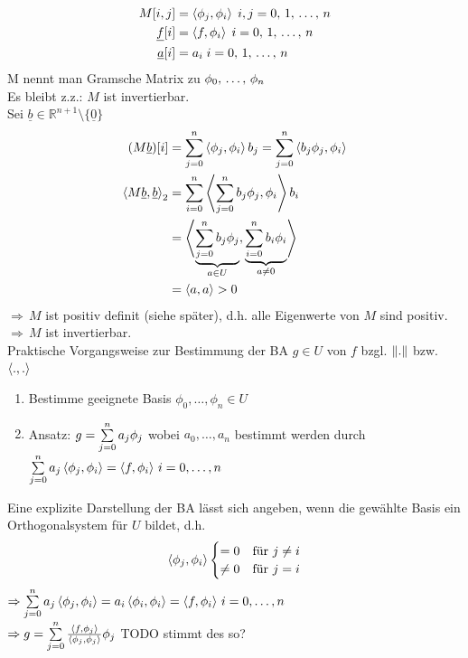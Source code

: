 \begin{align*}
  M[i,j] &= \left\langle \phi_j,  \phi_i \right\rangle\; i,j = 0,\,1,\,\ldots,\,n\\
    \underline{f}[i] &= \left\langle f,  \phi_i \right\rangle\; i = 0,\,1,\,\ldots,\,n\\
  \underline{a}[i] &= a_i\; i = 0,\,1,\,\ldots,\,n\\
\end{align*}
M nennt man Gramsche Matrix zu $\phi_0,\,\ldots,\,\phi_n$\\
Es bleibt z.z.: $M$ ist invertierbar.\\
Sei $\underline{b} \in \mathbb{R}^{n+1} \setminus \{\underline{0}\}$
\begin{align*}
  (M \underline{b})[i] &= \sum\limits_{j=0}^{n}{\left\langle \phi_j, \phi_i \right\rangle b_j} = \sum\limits_{j=0}^{n}{\left\langle b_j\phi_j, \phi_i \right\rangle}\\
  \left\langle M \underline{b}, \underline{b} \right\rangle_2 &= \sum\limits_{i=0}^{n}{\left\langle \sum\limits_{j=0}^{n}{b_j\phi_j}, \phi_i \right\rangle b_i}\\
  &= \left\langle \underbrace{\sum\limits_{j=0}^{n}{b_j\phi_j}}_{a \in U}, \underbrace{\sum\limits_{i=0}^{n}{b_i\phi_i}}_{a \neq 0} \right\rangle\\
  &= \left\langle a, a \right\rangle > 0
\end{align*}
$\Rightarrow\,M$ ist positiv definit (siehe später), d.h. alle Eigenwerte von $M$ sind positiv.\\
$\Rightarrow\,M$ ist invertierbar.\\
Praktische Vorgangsweise zur Bestimmung der BA $g \in U$ von $f$ bzgl. $\left\lVert . \right\rVert$ bzw. $\left\langle ., . \right\rangle$
\begin{enumerate}
  \item Bestimme geeignete Basis $\phi_0,\ldots,\phi_n \in U$
  \item Ansatz: $g = \sum\limits_{j=0}^{n}{a_j\phi_j}$ wobei $a_0,\ldots,a_n$ bestimmt werden durch 
    $\sum\limits_{j=0}^{n}{a_j\left\langle \phi_j, \phi_i \right\rangle} = \left\langle f, \phi_i \right\rangle\,i=0,\ldots,n$
\end{enumerate}
Eine explizite Darstellung der BA lässt sich angeben, wenn die gewählte Basis
ein Orthogonalsystem für $U$ bildet, d.h.
\begin{align*}
  \left\langle \phi_j, \phi_i \right\rangle \begin{cases}
    = 0 &\mbox{für } j \neq i\\
    \neq 0 &\mbox{für } j = i
  \end{cases}
\end{align*}
$\Rightarrow \sum\limits_{j=0}^{n}{a_j\left\langle \phi_j, \phi_i \right\rangle} = a_i \left\langle \phi_i, \phi_i \right\rangle = \left\langle f, \phi_i \right\rangle\,i=0,\ldots,n$\\
$\Rightarrow g = \sum\limits_{j=0}^{n}{\frac{\left\langle f, \phi_j \right\rangle}{\left\langle \phi_j, \phi_j \right\rangle} \phi_j}$ TODO stimmt des so?


